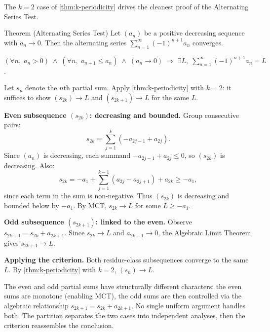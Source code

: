 The $k = 2$ case of \cref{thm:k-periodicity} drives the cleanest proof
of the Alternating Series Test.

\begin{theorembox}{Theorem (Alternating Series Test)}
\label{thm:alternating-series-test}
Let $(a_n)$ be a positive decreasing sequence with $a_n \to 0$. Then the
alternating series $\sum_{n=1}^{\infty} (-1)^{n+1} a_n$ converges.
\end{theorembox}

\begin{remark}
$(\forall n,\;a_n > 0)\;\land\;(\forall n,\;a_{n+1} \leq a_n)\;\land\;
(a_n \to 0) \;\Rightarrow\; \exists L,\;\sum_{n=1}^\infty (-1)^{n+1} a_n = L$.
\end{remark}

\begin{remark}
Let $s_n$ denote the $n$th partial sum. Apply \cref{thm:k-periodicity}
with $k = 2$: it suffices to show $(s_{2k}) \to L$ and $(s_{2k+1}) \to L$
for the same $L$.

\medskip
\noindent\textbf{Even subsequence $(s_{2k})$: decreasing and bounded.}
Group consecutive pairs:
\[
  s_{2k} = \sum_{j=1}^{k} (-a_{2j-1} + a_{2j}).
\]
Since $(a_n)$ is decreasing, each summand $-a_{2j-1} + a_{2j} \leq 0$,
so $(s_{2k})$ is decreasing. Also:
\[
  s_{2k} = -a_1 + \sum_{j=1}^{k-1}(a_{2j} - a_{2j+1}) + a_{2k} \geq -a_1,
\]
since each term in the sum is non-negative. Thus $(s_{2k})$ is decreasing
and bounded below by $-a_1$. By MCT, $s_{2k} \to L$ for some $L \geq -a_1$.

\medskip
\noindent\textbf{Odd subsequence $(s_{2k+1})$: linked to the even.}
Observe $s_{2k+1} = s_{2k} + a_{2k+1}$. Since $s_{2k} \to L$ and
$a_{2k+1} \to 0$, the Algebraic Limit Theorem gives $s_{2k+1} \to L$.

\medskip
\noindent\textbf{Applying the criterion.}
Both residue-class subsequences converge to the same $L$. By
\cref{thm:k-periodicity} with $k = 2$, $(s_n) \to L$.
\end{remark}

\begin{remark}
The even and odd partial sums have structurally different characters:
the even sums are monotone (enabling MCT), the odd sums are then
controlled via the algebraic relationship $s_{2k+1} = s_{2k} + a_{2k+1}$.
No single uniform argument handles both. The partition separates the two
cases into independent analyses, then the criterion reassembles the
conclusion.
\end{remark}

